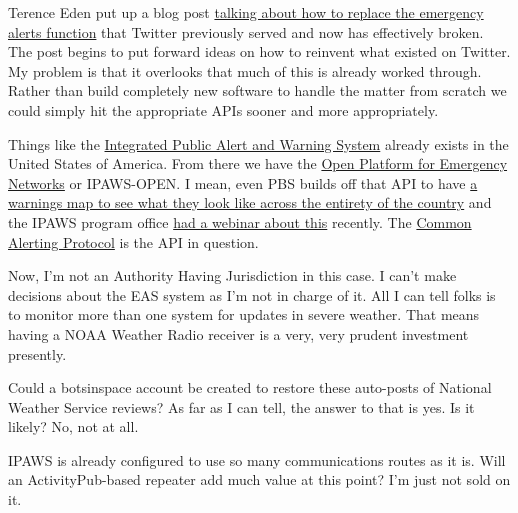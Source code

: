 Terence Eden put up a blog post
\href{https://web.archive.org/web/20230421163049/https://shkspr.mobi/blog/2023/04/how-do-you-decentralise-emergency-alerts/}{talking
about how to replace the emergency alerts function} that Twitter
previously served and now has effectively broken. The post begins to put
forward ideas on how to reinvent what existed on Twitter. My problem is
that it overlooks that much of this is already worked through. Rather
than build completely new software to handle the matter from scratch we
could simply hit the appropriate APIs sooner and more appropriately.

Things like the
\href{https://www.fema.gov/emergency-managers/practitioners/integrated-public-alert-warning-system}{Integrated
Public Alert and Warning System} already exists in the United States of
America. From there we have the
\href{https://www.fema.gov/emergency-managers/practitioners/integrated-public-alert-warning-system/technology-developers/ipaws-open}{Open
Platform for Emergency Networks} or IPAWS-OPEN. I mean, even PBS builds
off that API to have \href{https://warn.pbs.org}{a warnings map to see
what they look like across the entirety of the country} and the IPAWS
program office
\href{https://www.fema.gov/event/pbs-warn-your-live-wea-map}{had a
webinar about this} recently. The
\href{https://www.fema.gov/emergency-managers/practitioners/integrated-public-alert-warning-system/technology-developers/common-alerting-protocol}{Common
Alerting Protocol} is the API in question.

Now, I'm not an Authority Having Jurisdiction in this case. I can't make
decisions about the EAS system as I'm not in charge of it. All I can
tell folks is to monitor more than one system for updates in severe
weather. That means having a NOAA Weather Radio receiver is a very, very
prudent investment presently.

Could a botsinspace account be created to restore these auto-posts of
National Weather Service reviews? As far as I can tell, the answer to
that is yes. Is it likely? No, not at all.

IPAWS is already configured to use so many communications routes as it
is. Will an ActivityPub-based repeater add much value at this point? I'm
just not sold on it.
